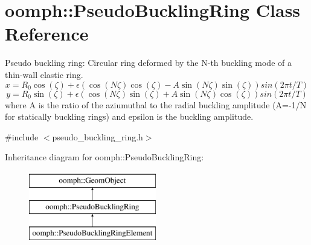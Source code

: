 \hypertarget{classoomph_1_1PseudoBucklingRing}{}\section{oomph\+:\+:Pseudo\+Buckling\+Ring Class Reference}
\label{classoomph_1_1PseudoBucklingRing}


Pseudo buckling ring\+: Circular ring deformed by the N-\/th buckling mode of a thin-\/wall elastic ring. \[ x = R_0 \cos(\zeta) + \epsilon \left( \cos(N \zeta) \cos(\zeta) - A \sin(N \zeta) \sin(\zeta) \right) sin(2 \pi t/T) \] \[ y = R_0 \sin(\zeta) + \epsilon \left( \cos(N \zeta) \sin(\zeta) + A \sin(N \zeta) \cos(\zeta) \right) sin(2 \pi t/T) \] where A is the ratio of the aziumuthal to the radial buckling amplitude (A=-\/1/N for statically buckling rings) and epsilon is the buckling amplitude.  




{\ttfamily \#include $<$pseudo\+\_\+buckling\+\_\+ring.\+h$>$}

Inheritance diagram for oomph\+:\+:Pseudo\+Buckling\+Ring\+:\begin{figure}[H]
\begin{center}
\leavevmode
\includegraphics[height=3.000000cm]{classoomph_1_1PseudoBucklingRing}
\end{center}
\end{figure}
